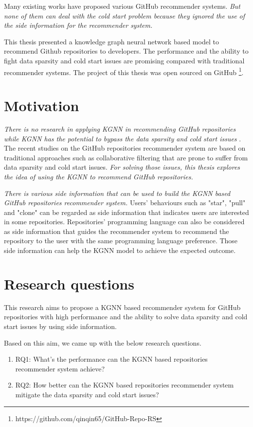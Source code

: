 \documentclass[11pt,twoside]{report}
\begin{document}
Many existing works have proposed various GitHub recommender systems. \textit{But none of them can deal with the cold start problem because they ignored the use of the side information for the recommender system.}

This thesis presented a knowledge graph neural network based model to recommend Github repositories to developers. The performance and the ability to fight data sparsity and cold start issues are promising compared with traditional recommender systems. The project of this thesis was open sourced on GitHub \footnote{https://github.com/qinqin65/GitHub-Repo-RS}.

\section{Motivation}
\textit{There is no research in applying KGNN in recommending GitHub repositories while KGNN has the potential to bypass the data sparsity and cold start issues} \cite{mansur_review_nodate}. The recent studies on the GitHub repositories recommender system are based on traditional approaches such as collaborative filtering that are prone to suffer from data sparsity and cold start issues. \textit{For solving those issues, this thesis explores the idea of using the KGNN to recommend GitHub repositories.}

\textit{There is various side information that can be used to build the KGNN based GitHub repositories recommender system.} Users’ behaviours such as "star", "pull" and "clone" can be regarded as side information that indicates users are interested in some repositories. Repositories' programming language can also be considered as side information that guides the recommender system to recommend the repository to the user with the same programming language preference. Those side information can help the KGNN model to achieve the expected outcome.

\section{Research questions}
This research aims to propose a KGNN based recommender system for GitHub repositories with high performance and the ability to solve data sparsity and cold start issues by using side information.

Based on this aim, we came up with the below research questions.

\begin{enumerate}
    \item RQ1: What’s the performance can the KGNN based repositories recommender system achieve?
    \item RQ2: How better can the KGNN based repositories recommender system mitigate the data sparsity and cold start issues?
\end{enumerate}
\end{document}
